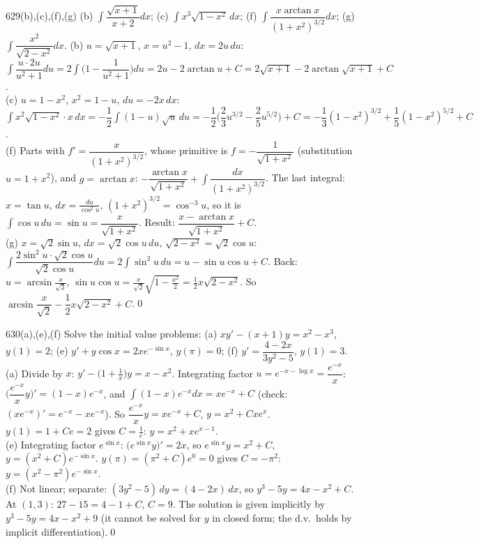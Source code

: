 \begin{bookex}{629(b),(c),(f),(g)}
(b) $\int\dfrac{\sqrt{x+1}}{x+2}dx$; (c) $\int x^3\sqrt{1-x^2}\,dx$; (f) $\int\dfrac{x\arctan x}{(1+x^2)^{3/2}}dx$; (g) $\int\dfrac{x^2}{\sqrt{2-x^2}}dx$.
\solution
(b) $u=\sqrt{x+1}$, $x=u^2-1$, $dx=2u\,du$: $\int\dfrac{u\cdot2u}{u^2+1}du=2\int\Big(1-\dfrac1{u^2+1}\Big)du=2u-2\arctan u+C=2\sqrt{x+1}-2\arctan\sqrt{x+1}+C$.\\
(c) $u=1-x^2$, $x^2=1-u$, $du=-2x\,dx$: $\int x^2\sqrt{1-x^2}\cdot x\,dx=-\dfrac12\int(1-u)\sqrt u\,du=-\dfrac12\Big(\dfrac23u^{3/2}-\dfrac25u^{5/2}\Big)+C=-\dfrac13(1-x^2)^{3/2}+\dfrac15(1-x^2)^{5/2}+C$.\\
(f) Parts with $f'=\dfrac{x}{(1+x^2)^{3/2}}$, whose primitive is $f=-\dfrac1{\sqrt{1+x^2}}$ (substitution $u=1+x^2$), and $g=\arctan x$: $-\dfrac{\arctan x}{\sqrt{1+x^2}}+\int\dfrac{dx}{(1+x^2)^{3/2}}$. The last integral: $x=\tan u$, $dx=\frac{du}{\cos^2u}$, $(1+x^2)^{3/2}=\cos^{-3}u$, so it is $\int\cos u\,du=\sin u=\dfrac x{\sqrt{1+x^2}}$. Result: $\dfrac{x-\arctan x}{\sqrt{1+x^2}}+C$.\\
(g) $x=\sqrt2\sin u$, $dx=\sqrt2\cos u\,du$, $\sqrt{2-x^2}=\sqrt2\cos u$: $\int\dfrac{2\sin^2u\cdot\sqrt2\cos u}{\sqrt2\cos u}du=2\int\sin^2u\,du=u-\sin u\cos u+C$. Back: $u=\arcsin\frac x{\sqrt2}$, $\sin u\cos u=\frac x{\sqrt2}\sqrt{1-\frac{x^2}2}=\frac12x\sqrt{2-x^2}$. So $\arcsin\dfrac x{\sqrt2}-\dfrac12x\sqrt{2-x^2}+C$.\qed
\end{bookex}

\begin{bookex}{630(a),(e),(f)}
Solve the initial value problems: (a) $xy'-(x+1)y=x^2-x^3$, $y(1)=2$; (e) $y'+y\cos x=2xe^{-\sin x}$, $y(\pi)=0$; (f) $y'=\dfrac{4-2x}{3y^2-5}$, $y(1)=3$.
\solution
(a) Divide by $x$: $y'-\big(1+\frac1x\big)y=x-x^2$. Integrating factor $u=e^{-x-\log x}=\dfrac{e^{-x}}x$: $\Big(\dfrac{e^{-x}}xy\Big)'=(1-x)e^{-x}$, and $\int(1-x)e^{-x}dx=xe^{-x}+C$ (check: $(xe^{-x})'=e^{-x}-xe^{-x}$). So $\dfrac{e^{-x}}xy=xe^{-x}+C$, $y=x^2+Cxe^x$. $y(1)=1+Ce=2$ gives $C=\frac1e$: $y=x^2+xe^{x-1}$.\\
(e) Integrating factor $e^{\sin x}$: $\big(e^{\sin x}y\big)'=2x$, so $e^{\sin x}y=x^2+C$, $y=(x^2+C)e^{-\sin x}$. $y(\pi)=(\pi^2+C)e^0=0$ gives $C=-\pi^2$: $y=(x^2-\pi^2)e^{-\sin x}$.\\
(f) Not linear; separate: $(3y^2-5)\,dy=(4-2x)\,dx$, so $y^3-5y=4x-x^2+C$. At $(1,3)$: $27-15=4-1+C$, $C=9$. The solution is given implicitly by $y^3-5y=4x-x^2+9$ (it cannot be solved for $y$ in closed form; the d.v.\ holds by implicit differentiation).\qed
\end{bookex}

